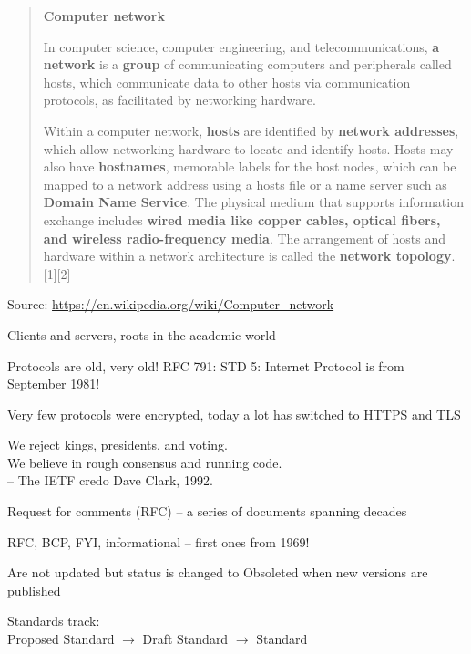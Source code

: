 \documentclass[Screen16to9,17pt]{foils}
\begin{document}
\begin{quote}
\textbf{\large Computer network}

In computer science, computer engineering, and telecommunications, \textbf{a network} is a \textbf{group} of communicating computers and peripherals called hosts, which communicate data to other hosts via communication protocols, as facilitated by networking hardware.

Within a computer network, \textbf{hosts} are identified by \textbf{network addresses}, which allow networking hardware to locate and identify hosts. Hosts may also have \textbf{hostnames}, memorable labels for the host nodes, which can be mapped to a network address using a hosts file or a name server such as \textbf{Domain Name Service}. The physical medium that supports information exchange includes \textbf{wired media like copper cables, optical fibers, and wireless radio-frequency media}. The arrangement of hosts and hardware within a network architecture is called the \textbf{network topology}.[1][2]
\end{quote}
Source: \url{https://en.wikipedia.org/wiki/Computer_network}





\begin{list1}
\item Clients and servers, roots in the academic world
\item Protocols are old, very old! RFC 791: STD 5: Internet Protocol is from  September 1981!
\item Very few protocols were encrypted, today a lot has switched to HTTPS and TLS
\end{list1}


{\hlkbig \color{titlecolor}
We reject kings, presidents, and voting.\\
We believe in rough consensus and running code.\\
-- The IETF credo Dave Clark, 1992.}

\begin{list1}
\item Request for comments (RFC) -- a series of documents spanning decades
\item RFC, BCP, FYI, informational -- first ones from 1969!
\item Are not updated but status is changed to Obsoleted when new versions are published
\item Standards track:\\
Proposed Standard $\rightarrow$ Draft Standard $\rightarrow$ Standard
\end{list1}
\end{document}
